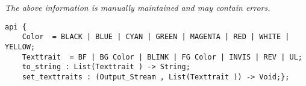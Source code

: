 \label{api:Ansi\_Terminal}

{\tiny \it The above information is manually maintained and may contain errors.}
\begin{verbatim}
api {
    Color  = BLACK | BLUE | CYAN | GREEN | MAGENTA | RED | WHITE | YELLOW;
    Texttrait  = BF | BG Color | BLINK | FG Color | INVIS | REV | UL;
    to_string : List(Texttrait ) -> String;
    set_texttraits : (Output_Stream , List(Texttrait )) -> Void;};
\end{verbatim}
